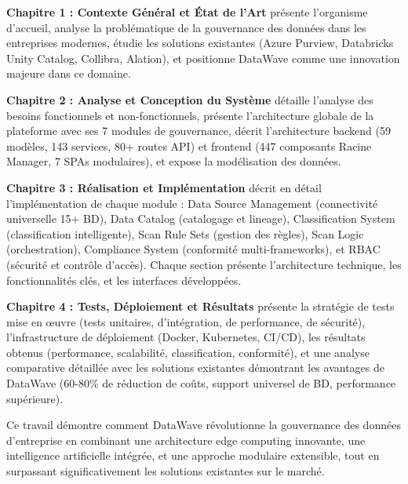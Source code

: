 \textbf{Chapitre 1 : Contexte Général et État de l'Art} présente l'organisme d'accueil, analyse la problématique de la gouvernance des données dans les entreprises modernes, étudie les solutions existantes (Azure Purview, Databricks Unity Catalog, Collibra, Alation), et positionne DataWave comme une innovation majeure dans ce domaine.

\textbf{Chapitre 2 : Analyse et Conception du Système} détaille l'analyse des besoins fonctionnels et non-fonctionnels, présente l'architecture globale de la plateforme avec ses 7 modules de gouvernance, décrit l'architecture backend (59 modèles, 143 services, 80+ routes API) et frontend (447 composants Racine Manager, 7 SPAs modulaires), et expose la modélisation des données.

\textbf{Chapitre 3 : Réalisation et Implémentation} décrit en détail l'implémentation de chaque module : Data Source Management (connectivité universelle 15+ BD), Data Catalog (catalogage et lineage), Classification System (classification intelligente), Scan Rule Sets (gestion des règles), Scan Logic (orchestration), Compliance System (conformité multi-frameworks), et RBAC (sécurité et contrôle d'accès). Chaque section présente l'architecture technique, les fonctionnalités clés, et les interfaces développées.

\textbf{Chapitre 4 : Tests, Déploiement et Résultats} présente la stratégie de tests mise en œuvre (tests unitaires, d'intégration, de performance, de sécurité), l'infrastructure de déploiement (Docker, Kubernetes, CI/CD), les résultats obtenus (performance, scalabilité, classification, conformité), et une analyse comparative détaillée avec les solutions existantes démontrant les avantages de DataWave (60-80\% de réduction de coûts, support universel de BD, performance supérieure).

Ce travail démontre comment DataWave révolutionne la gouvernance des données d'entreprise en combinant une architecture edge computing innovante, une intelligence artificielle intégrée, et une approche modulaire extensible, tout en surpassant significativement les solutions existantes sur le marché.
